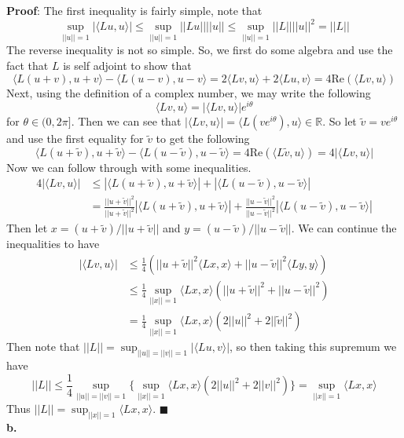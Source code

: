 \documentclass[11pt]{article}
\begin{document}
{\bf Proof}: The first inequality is fairly simple, note that 
\[ \sup_{||u|| = 1} |\langle Lu, u\rangle| \leq \sup_{||u|| = 1} ||Lu||||u|| \leq \sup_{||u|| = 1} ||L||||u||^2 = ||L|| \]
The reverse inequality is not so simple. So, we first do some algebra and use the fact that $L$ is self adjoint to show that 
\[ \langle L(u+v), u+v \rangle - \langle L(u-v), u-v \rangle = 2\langle Lv,u \rangle + 2\langle Lu, v\rangle = 4\text{Re}(\langle Lv, u\rangle) \]
Next, using the definition of a complex number, we may write the following 
\[ \langle Lv, u \rangle = |\langle Lv, u\rangle|e^{i\theta} \]
for $\theta\in (0,2\pi]$. Then we can see that $|\langle Lv, u\rangle| = \langle L(ve^{i\theta}),u \rangle \in \mathbb{R} $. So let $\tilde{v} = ve^{i\theta}$ and use the first equality for $\tilde{v}$ to get the following
\[ \langle L(u+\tilde{v}), u+\tilde{v} \rangle - \langle L(u-\tilde{v}), u-\tilde{v} \rangle = 4\text{Re}(\langle L\tilde{v}, u \rangle) = 4|\langle Lv, u\rangle| \]
Now we can follow through with some inequalities. 
\begin{align*}
4|\langle Lv, u \rangle| &\leq |\langle L(u+\tilde{v}), u+\tilde{v} \rangle| + |\langle L(u-\tilde{v}), u-\tilde{v} \rangle| \\
&= \frac{||u + \tilde{v}||^2}{||u+\tilde{v}||^2}|\langle L(u+\tilde{v}), u+\tilde{v} \rangle| + \frac{||u - \tilde{v}||^2}{||u - \tilde{v}||^2}|\langle L(u-\tilde{v}), u-\tilde{v} \rangle|
\end{align*}
Then let $x = (u + \tilde{v})/||u + \tilde{v}||$ and $y = (u - \tilde{v})/||u - \tilde{v}||$. We can continue the inequalities to have 
\begin{align*}
|\langle Lv, u \rangle| &\leq \frac{1}{4}(||u+\tilde{v}||^2 \langle Lx,x \rangle + ||u - \tilde{v}||^2 \langle Ly, y \rangle) \\
&\leq \frac{1}{4}\sup_{||x|| = 1} \langle Lx, x \rangle (||u + \tilde{v}||^2 + ||u - \tilde{v}||^2 ) \\
&= \frac{1}{4}\sup_{||x|| = 1} \langle Lx, x \rangle(2||u||^2 + 2||\tilde{v}||^2)
\end{align*}
Then note that $||L|| = \sup_{||u|| = ||v|| = 1} |\langle Lu, v \rangle|$, so then taking this supremum we have 
\[ ||L|| \leq \frac{1}{4} \sup_{||u|| = ||v|| = 1} \{ \sup_{||x|| = 1} \langle Lx, x \rangle(2||u||^2 + 2||v||^2) \} = \sup_{||x|| = 1} \langle Lx, x \rangle \]
Thus $||L|| = \sup_{||x|| = 1} \langle Lx, x \rangle$. $\blacksquare$
\\[16pt]


{\bf b.} 
\end{document}
